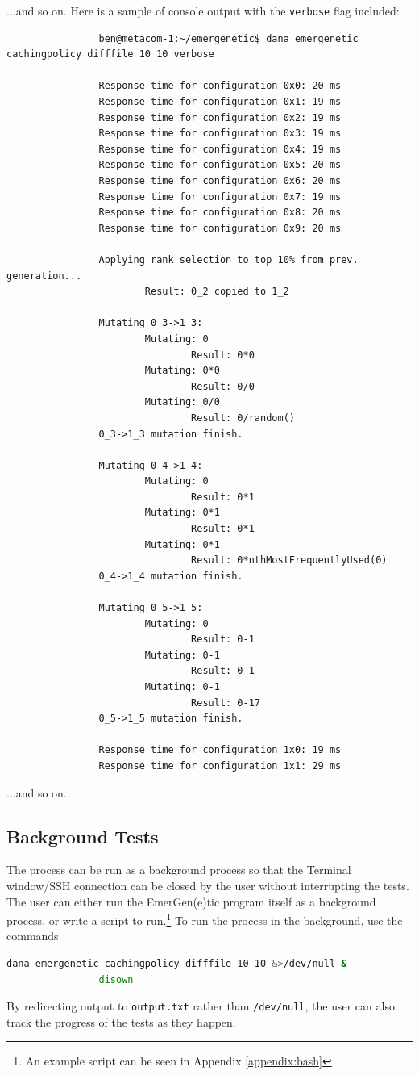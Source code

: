 \documentclass[compsoc,12pt,a4paper]{IEEEtran}
\begin{document}
			...and so on. Here is a sample of console output with the \lstinline|verbose| flag included:
			\begin{lstlisting}
				ben@metacom-1:~/emergenetic$ dana emergenetic cachingpolicy difffile 10 10 verbose
				
				Response time for configuration 0x0: 20 ms
				Response time for configuration 0x1: 19 ms
				Response time for configuration 0x2: 19 ms
				Response time for configuration 0x3: 19 ms
				Response time for configuration 0x4: 19 ms
				Response time for configuration 0x5: 20 ms
				Response time for configuration 0x6: 20 ms
				Response time for configuration 0x7: 19 ms
				Response time for configuration 0x8: 20 ms
				Response time for configuration 0x9: 20 ms
				
				Applying rank selection to top 10% from prev. generation...
				        Result: 0_2 copied to 1_2
				
				Mutating 0_3->1_3:
				        Mutating: 0
				                Result: 0*0
				        Mutating: 0*0
				                Result: 0/0
				        Mutating: 0/0
				                Result: 0/random()
				0_3->1_3 mutation finish.
				
				Mutating 0_4->1_4:
				        Mutating: 0
				                Result: 0*1
				        Mutating: 0*1
				                Result: 0*1
				        Mutating: 0*1
				                Result: 0*nthMostFrequentlyUsed(0)
				0_4->1_4 mutation finish.
				
				Mutating 0_5->1_5:
				        Mutating: 0
				                Result: 0-1
				        Mutating: 0-1
				                Result: 0-1
				        Mutating: 0-1
				                Result: 0-17
				0_5->1_5 mutation finish.
			
				Response time for configuration 1x0: 19 ms
				Response time for configuration 1x1: 29 ms
			\end{lstlisting}
			...and so on.
			
		\subsection{Background Tests}
		
			The process can be run as a background process so that the Terminal window/SSH connection can be closed by the user without interrupting the tests. The user can either run the EmerGen(e)tic program itself as a background process, or write a script to run.\footnote{An example script can be seen in Appendix \ref{appendix:bash}} To run the process in the background, use the commands
			\begin{lstlisting}[language=bash]
				dana emergenetic cachingpolicy difffile 10 10 &>/dev/null &
				disown
			\end{lstlisting}
			By redirecting output to \lstinline|output.txt| rather than \lstinline|/dev/null|, the user can also track the progress of the tests as they happen.
	
\end{document}
